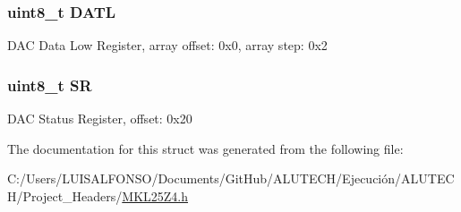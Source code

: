 \subsubsection[{D\+A\+T\+L}]{\setlength{\rightskip}{0pt plus 5cm}uint8\+\_\+t D\+A\+T\+L}\label{struct_d_a_c___mem_map_a906a4999a740a6bc4fd750743203c7a1}
D\+A\+C Data Low Register, array offset\+: 0x0, array step\+: 0x2 \hypertarget{struct_d_a_c___mem_map_a05bb2d07a6ae315af41ebe1bb7cd3d5c}{}
\subsubsection[{S\+R}]{\setlength{\rightskip}{0pt plus 5cm}uint8\+\_\+t S\+R}\label{struct_d_a_c___mem_map_a05bb2d07a6ae315af41ebe1bb7cd3d5c}
D\+A\+C Status Register, offset\+: 0x20 

The documentation for this struct was generated from the following file\+:\begin{DoxyCompactItemize}
\item 
C\+:/\+Users/\+L\+U\+I\+S\+A\+L\+F\+O\+N\+S\+O/\+Documents/\+Git\+Hub/\+A\+L\+U\+T\+E\+C\+H/\+Ejecución/\+A\+L\+U\+T\+E\+C\+H/\+Project\+\_\+\+Headers/\hyperlink{_m_k_l25_z4_8h}{M\+K\+L25\+Z4.\+h}\end{DoxyCompactItemize}
